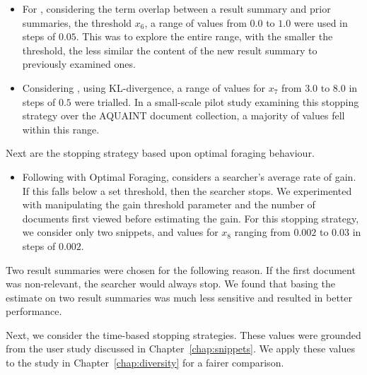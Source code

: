 \begin{itemize}
    
    \item{For , considering the term overlap between a result summary and prior summaries, the threshold $x_6$, a range of values from $0.0$ to $1.0$ were used in steps of $0.05$. This was to explore the entire range, with the smaller the threshold, the less similar the content of the new result summary to previously examined ones.}
    
    \item{Considering , using KL-divergence, a range of values for $x_7$ from $3.0$ to $8.0$ in steps of $0.5$ were trialled. In a small-scale pilot study examining this stopping strategy over the AQUAINT document collection, a majority of values fell within this range.}
    
\end{itemize}

Next are the stopping strategy based upon optimal foraging behaviour.

\begin{itemize}
    
    \item{Following with Optimal Foraging,  considers a searcher's average rate of gain. If this falls below a set threshold, then the searcher stops. We experimented with manipulating the gain threshold parameter and the number of documents first viewed before estimating the gain. For this stopping strategy, we consider only two snippets, and values for $x_8$ ranging from $0.002$ to $0.03$ in steps of $0.002$.}
    
\end{itemize}

Two result summaries were chosen for the following reason. If the first document was non-relevant, the searcher would always stop. We found that basing the estimate on two result summaries was much less sensitive and resulted in better performance. 

Next, we consider the time-based stopping strategies. These values were grounded from the user study discussed in Chapter~\ref{chap:snippets}. We apply these values to the study in Chapter~\ref{chap:diversity} for a fairer comparison.

